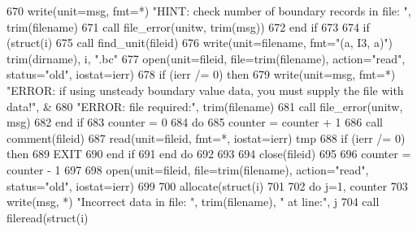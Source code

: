 \begin{DoxyCode}
670           \textcolor{keyword}{write}(unit=msg, fmt=*) \textcolor{stringliteral}{"HINT: check number of boundary records in file: "}\textcolor{comment}{, trim(filename)}
671 \textcolor{comment}{          }\textcolor{keyword}{call }file_error(unitw, trim(msg))
672 \textcolor{keywordflow}{        end if}
673 
674         \textcolor{keywordflow}{if} (struct(i)%
675           \textcolor{keyword}{call }find_unit(fileid)
676           \textcolor{keyword}{write}(unit=filename, fmt=\textcolor{stringliteral}{"(a, I3, a)"}) trim(dirname), i, \textcolor{stringliteral}{".bc"}
677           \textcolor{keyword}{open}(unit=fileid, file=trim(filename), action=\textcolor{stringliteral}{"read"}, status=\textcolor{stringliteral}{"old"}\textcolor{comment}{,  iostat=ierr)}
678 \textcolor{comment}{          }\textcolor{keywordflow}{if} (ierr /= 0) \textcolor{keywordflow}{then}
679             \textcolor{keyword}{write}(unit=msg, fmt=*) \textcolor{stringliteral}{"ERROR: if using unsteady boundary value data, you must supply the file
       with data!"}\textcolor{comment}{, &}
680 \textcolor{comment}{            }\textcolor{stringliteral}{"ERROR: file required:"}, trim(filename)
681             \textcolor{keyword}{call }file_error(unitw, msg)
682 \textcolor{keywordflow}{          end if}
683           counter = 0
684           \textcolor{keywordflow}{do} 
685             counter = counter + 1
686             \textcolor{keyword}{call }comment(fileid)
687             \textcolor{keyword}{read}(unit=fileid, fmt=*, iostat=ierr) tmp
688             \textcolor{keywordflow}{if} (ierr /= 0) \textcolor{keywordflow}{then}
689               \textcolor{keywordflow}{EXIT}
690 \textcolor{keywordflow}{            end if}
691 \textcolor{keywordflow}{          end do}
692 
693           
694           \textcolor{keyword}{close}(fileid)
695 
696           counter = counter - 1
697  
698           \textcolor{keyword}{open}(unit=fileid, file=trim(filename), action=\textcolor{stringliteral}{"read"}, status=\textcolor{stringliteral}{"old"}\textcolor{comment}{,  iostat=ierr)}
699 \textcolor{comment}{   }
700 \textcolor{comment}{          }\textcolor{keyword}{allocate}(struct(i)%
701 
702           \textcolor{keywordflow}{do} j=1, counter
703             \textcolor{keyword}{write}(msg, *) \textcolor{stringliteral}{"Incorrect data in file:  "}, trim(filename), \textcolor{stringliteral}{"    at line:"}\textcolor{comment}{, j}
704 \textcolor{comment}{            }\textcolor{keyword}{call }fileread(struct(i)%

\end{DoxyCode}
